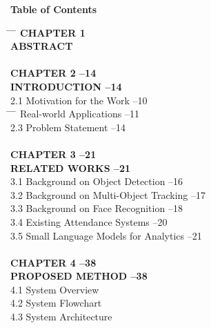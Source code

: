 \documentclass{report}
\begin{document}
\newpage
\begin{center}
    \textbf{\Large Table of Contents}
\end{center}
\noindent
\begin{tabbing}
    \hspace{1cm} \= \hspace{11cm} \= \hspace{2cm} \= \kill
    \textbf{CHAPTER 1 \> \> } \\[0.2cm]
    \textbf{ABSTRACT \> \> } \\[0.2cm]
    \\
    \textbf{CHAPTER 2 \> \> --14} \\[0.2cm]
    \textbf{INTRODUCTION \> \> --14} \\[0.2cm]
    2.1 \> Motivation for the Work \> --10 \\[0.2cm]
    \hspace{1cm} \= \hspace{11cm} \= \hspace{2cm} \=  \> Real-world Applications \> --11 \\[0.2cm]
    2.3 \> Problem Statement \> --14 \\[0.2cm]
    \\
    \textbf{CHAPTER 3 \> \> --21} \\[0.2cm]
    \textbf{RELATED WORKS \> \> --21} \\[0.2cm]
    3.1 \> Background on Object Detection \> --16 \\[0.2cm]
    3.2 \> Background on Multi-Object Tracking \> --17 \\[0.2cm]
    3.3 \> Background on Face Recognition \> --18 \\[0.2cm]
    3.4 \> Existing Attendance Systems \> --20 \\[0.2cm]
    3.5 \> Small Language Models for Analytics \> --21 \\[0.2cm]
    \\
    \textbf{CHAPTER 4 \> \> --38} \\[0.2cm]
    \textbf{PROPOSED METHOD \> \> --38} \\[0.2cm]
    4.1 \> System Overview \>  \\[0.2cm]
    4.2 \> System Flowchart \>  \\[0.2cm]
    4.3 \> System Architecture \>  \\[0.2cm]

\end{tabbing}
\end{document}
